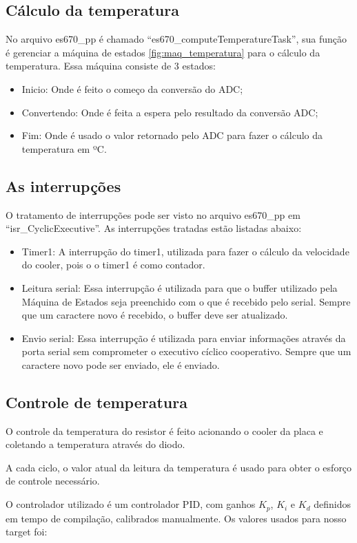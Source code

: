 \documentclass{article}
\begin{document}
\subsection{Cálculo da temperatura}
No arquivo es670\_pp é chamado ``es670\_computeTemperatureTask'', sua função é gerenciar a máquina de estados \ref{fig:maq_temperatura} para o cálculo da temperatura.
Essa máquina consiste de 3 estados:
\begin{itemize}
\item Inicio: Onde é feito o começo da conversão do ADC;
\item Convertendo: Onde é feita a espera pelo resultado da conversão ADC;
\item Fim: Onde é usado o valor retornado pelo ADC para fazer o cálculo da temperatura em ºC.
\end{itemize}

\subsection{As interrupções}
O tratamento de interrupções pode ser visto no arquivo es670\_pp em ``isr\_CyclicExecutive''. As interrupções tratadas estão listadas abaixo:
\begin{itemize}
\item Timer1: A interrupção do timer1, utilizada para fazer o cálculo da velocidade do cooler, pois o o timer1 é como contador.
\item Leitura serial: Essa interrupção é utilizada para que o buffer utilizado pela Máquina de Estados seja preenchido com o que é recebido pelo serial. Sempre que um caractere novo é recebido, o buffer deve ser atualizado.
\item Envio serial: Essa interrupção é utilizada para enviar informações através da porta serial sem comprometer o executivo cíclico cooperativo. Sempre que um caractere novo pode ser enviado, ele é enviado.
\end{itemize}

\subsection{Controle de temperatura}
O controle da temperatura do resistor é feito acionando o cooler da placa e coletando a temperatura através do diodo.

A cada ciclo, o valor atual da leitura da temperatura é usado para obter o esforço de controle necessário.

O controlador utilizado é um controlador PID, com ganhos $K_p$, $K_i$ e $K_d$ definidos em tempo de compilação, calibrados manualmente. Os valores usados para nosso target foi:
\end{document}
